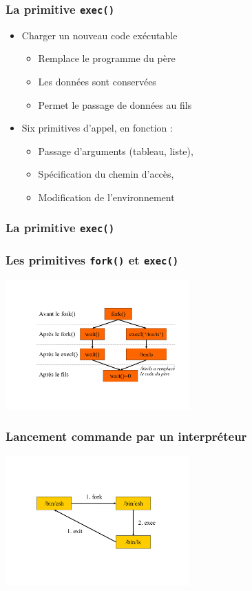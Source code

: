 \begin{frame}
\frametitle{La primitive \texttt{exec()}}
\begin{itemize}
\item Charger un nouveau code exécutable
\begin{itemize}
\item Remplace le programme du père
\item Les données sont conservées
\item Permet le passage de données au fils
\end{itemize}
\item Six primitives d’appel, en fonction :
\begin{itemize}
\item Passage d’arguments (tableau, liste),
\item Spécification du chemin d’accès,
\item Modification de l’environnement
\end{itemize}
\end{itemize}
\end{frame}


\begin{frame}[fragile]
\frametitle{La primitive \texttt{exec()}}
\begin{small}

\end{small}
\end{frame}


\begin{frame}
\frametitle{Les primitives \texttt{fork()} et \texttt{exec()}}
\includegraphics[height=5cm]{../illustration/fork_exemple.pdf}
\end{frame}


\begin{frame}
\frametitle{Lancement commande par un interpréteur}
\includegraphics[height=5cm]{../illustration/execution_exemple.pdf}
\end{frame}


